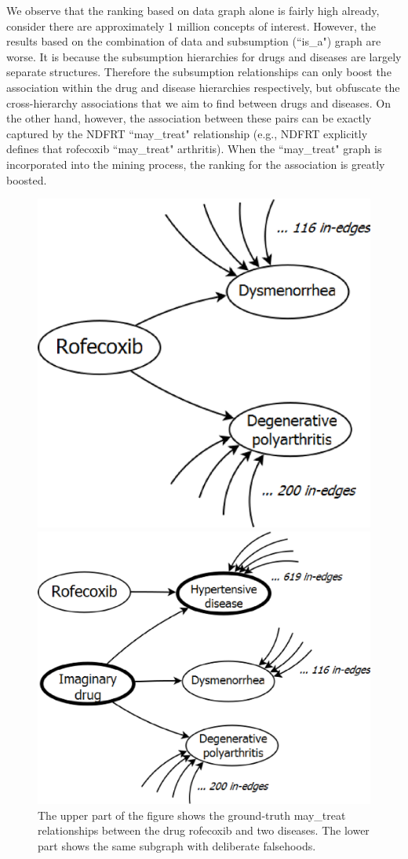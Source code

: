 We observe that the ranking based on data graph alone is fairly high already, consider there are approximately 1 million concepts of interest. However, the results based on the combination of data and subsumption (``is\_a") graph are worse. It is because the subsumption hierarchies for drugs and diseases are largely separate structures. Therefore the subsumption relationships can only boost the association within the drug and disease hierarchies respectively, but obfuscate the cross-hierarchy associations that we aim to find between drugs and diseases. On the other hand, however, the association between these pairs can be exactly captured by the NDFRT ``may\_treat" relationship (e.g., NDFRT explicitly defines that rofecoxib ``may\_treat" arthritis). When the ``may\_treat" graph is incorporated into the mining process, the ranking for the association is greatly boosted.


\begin{figure}[htbp]
\begin{minipage}[c]{0.49\textwidth}\centering
\includegraphics[width=.54\textwidth]{fig/may_treat.eps}
\end{minipage}
\begin{minipage}[c]{0.49\textwidth}\centering
\includegraphics[width=.7\textwidth]{fig/may_treat_augmented.eps}
\end{minipage}
\caption[The may\_treat subgraph]{\label{fig:may_treat} The upper part of the figure shows the ground-truth may\_treat relationships between the drug rofecoxib and two diseases. The lower part shows the same subgraph with deliberate falsehoods.}
\end{figure}

